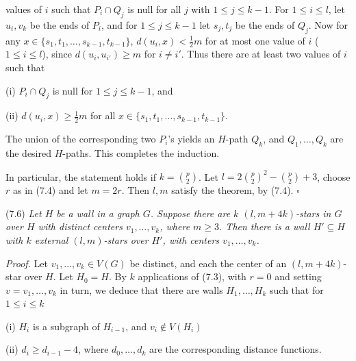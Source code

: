 \noindent values of $i$ such that $P_i \cap Q_j$ is null for all $j$ with $1 \le j \le k - 1$. For $1 \le i \le l$, let $u_i, v_k$ be the ends of $P_i$, and for $1 \le j \le k - 1$ let $s_j, t_j$ be the ends of $Q_j$. Now for any $x \in \{s_1, t_1, \dots, s_{k - 1}, t_{k - 1}\}$, $d(u_i, x) < \frac{1}{2}m$ for at most one value of $i$ ($1 \le i \le l$), since $d(u_i, u_{i'}) \ge m$ for $i \ne i'$. Thus there are at least two values of $i$ such that

\hspace*{12pt}(i) $P_i \cap Q_j$ is null for $1 \le j \le k - 1$, and

\hspace*{12pt}(ii) $d(u_i, x) \ge \frac{1}{2}m$ for all $x \in \{s_1, t_1, \dots, s_{k - 1}, t_{k - 1}\}$.

The union of the corresponding two $P_i$'s yields an $H$-path $Q_k$, and $Q_1, \dots, Q_k$ are the desired $H$-paths. This completes the induction.

In particular, the statement holds if $k = \binom{p}{2}$. Let $l = 2\binom{p}{2}^2 - \binom{p}{2} + 3$, choose $r$ as in (7.4) and let $m = 2r$. Then $l, m$ satisfy the theorem, by (7.4). $\square$

\stmt
(7.6) \textit{Let $H$ be a wall in a graph $G$. Suppose there are $k$ $(l, m + 4k)$-stars in $G$ over $H$ with distinct centers $v_1, \dots, v_k$, where $m \ge 3$. Then there is a wall $H' \subseteq H$ with $k$ external $(l, m)$-stars over $H'$, with centers $v_1, \dots, v_k$.}

\textit{Proof.} Let $v_1, \dots, v_k \in V(G)$ be distinct, and each the center of an $(l, m + 4k)$-star over $H$. Let $H_0 = H$. By $k$ applications of (7.3), with $r = 0$ and setting $v = v_1, \dots, v_k$ in turn, we deduce that there are walls $H_1, \dots, H_k$  such that for $1 \le i \le k$

\hspace*{12pt}(i) $H_i$ is a subgraph of $H_{i - 1}$, and $v_i \notin V(H_i)$

\hspace*{12pt}(ii) $d_i \ge d_{i - 1} - 4$, where $d_0, \dots, d_k$ are the corresponding distance functions.

